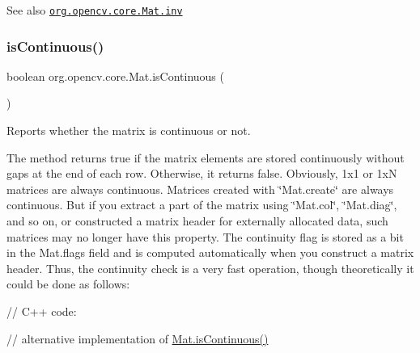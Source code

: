 \begin{DoxySeeAlso}{See also}
\href{http://docs.opencv.org/modules/core/doc/basic_structures.html#mat-inv}{\tt org.\+opencv.\+core.\+Mat.\+inv} 
\end{DoxySeeAlso}
\mbox{\label{classorg_1_1opencv_1_1core_1_1_mat_a0aaf7d8f437a0dbd73d9f9d1534404f1}} 
\subsubsection{\texorpdfstring{is\+Continuous()}{isContinuous()}}
{\footnotesize\ttfamily boolean org.\+opencv.\+core.\+Mat.\+is\+Continuous (\begin{DoxyParamCaption}{ }\end{DoxyParamCaption})}

Reports whether the matrix is continuous or not.

The method returns {\ttfamily true} if the matrix elements are stored continuously without gaps at the end of each row. Otherwise, it returns {\ttfamily false}. Obviously, {\ttfamily 1x1} or {\ttfamily 1xN} matrices are always continuous. Matrices created with \char`\"{}\+Mat.\+create\char`\"{} are always continuous. But if you extract a part of the matrix using \char`\"{}\+Mat.\+col\char`\"{}, \char`\"{}\+Mat.\+diag\char`\"{}, and so on, or constructed a matrix header for externally allocated data, such matrices may no longer have this property. The continuity flag is stored as a bit in the {\ttfamily Mat.\+flags} field and is computed automatically when you construct a matrix header. Thus, the continuity check is a very fast operation, though theoretically it could be done as follows\+: {\ttfamily }

{\ttfamily }

{\ttfamily }

{\ttfamily // C++ code\+:}

{\ttfamily }

{\ttfamily }

{\ttfamily // alternative implementation of \mbox{\hyperlink{classorg_1_1opencv_1_1core_1_1_mat_a0aaf7d8f437a0dbd73d9f9d1534404f1}{Mat.\+is\+Continuous()}}}

{\ttfamily }

{\ttfamily }

